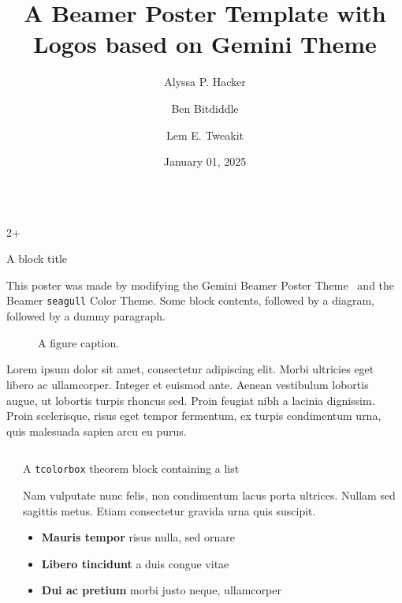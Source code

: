 \documentclass[final]{beamer}
\title{A Beamer Poster Template with Logos based on Gemini Theme}
\author{Alyssa P. Hacker \inst{1} \and Ben Bitdiddle \inst{2} \and Lem E. Tweakit \inst{2}}
\institute[shortinst]{\inst{1} Some Institute \samelineand \inst{2} Another Institute}
\date{January 01, 2025}
\newlength{\sepwidth}
\newlength{\colwidth}
\newcommand{\separatorcolumn}{\begin{column}{\sepwidth}\end{column}}
\begin{document}
\begin{frame}[t]

	\begin{columns}[t]

		\begin{column}{2\colwidth+\sepwidth}
			\begin{block}{A block title}

				This poster was made by modifying the Gemini Beamer Poster Theme~\parencite{Athalye2018} and the Beamer \texttt{seagull} Color Theme.
				Some block contents, followed by a diagram, followed by a dummy paragraph.

				\begin{figure}
					\centering
					\caption{A figure caption.}
				\end{figure}

				Lorem ipsum dolor sit amet, consectetur adipiscing elit. Morbi ultricies
				eget libero ac ullamcorper. Integer et euismod ante. Aenean vestibulum
				lobortis augue, ut lobortis turpis rhoncus sed. Proin feugiat nibh a
				lacinia dignissim. Proin scelerisque, risus eget tempor fermentum, ex
				turpis condimentum urna, quis malesuada sapien arcu eu purus.

			\end{block}
		\end{column}

	\end{columns}

	\begin{columns}[t]
		\separatorcolumn

		\begin{column}{\colwidth}

			\begin{thm}{A \texttt{tcolorbox} theorem block containing a list}{}

				Nam vulputate nunc felis, non condimentum lacus porta ultrices. Nullam sed
				sagittis metus. Etiam consectetur gravida urna quis suscipit.

				\begin{itemize}
					\item \textbf{Mauris tempor} risus nulla, sed ornare
					\item \textbf{Libero tincidunt} a duis congue vitae
					\item \textbf{Dui ac pretium} morbi justo neque, ullamcorper
				\end{itemize}


\end{thm}
\end{column}
\end{columns}
\end{frame}
\end{document}

